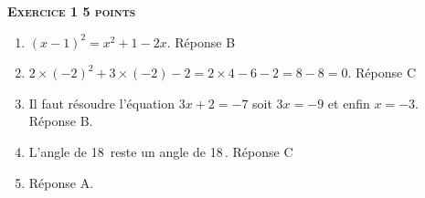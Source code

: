 \textbf{\textsc{Exercice 1 \hfill 5 points}}

\medskip

%
%
%
%
\begin{enumerate}
\item $(x - 1)^2 = x^2 + 1 - 2x$. Réponse B
\item $2\times (- 2)^2 + 3 \times (- 2) - 2 = 2 \times 4  - 6 - 2 = 8 - 8 = 0$. Réponse C
\item Il faut résoudre l'équation $3x + 2 = - 7$ soit $3x = - 9$ et enfin $x = - 3$. Réponse B.
\item L'angle de 18\,\degres{} reste un angle de 18\,\degres{}. Réponse C
\item Réponse A.
\end{enumerate}

\vspace{0.5cm}

